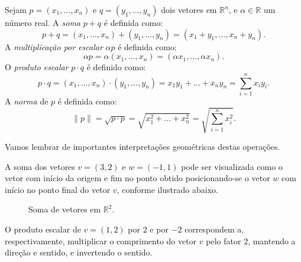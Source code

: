 \begin{definition}
    Sejam $p=(x_1, \ldots, x_n)$ e $q=(y_1, \ldots, y_n)$ dois vetores em $\mathbb R^n$, e $\alpha \in \mathbb R$ um número real.
    A \emph{soma} $p+q$ é definida como:
    \begin{equation*}
        p+q =(x_1, \ldots, x_n)+(y_1, \ldots, y_n)=(x_1+y_1, \ldots, x_n+y_n).
    \end{equation*}
    A \emph{multiplicação por escalar} $\alpha p$ é definida como:
    \begin{equation*}
        \alpha p = \alpha (x_1, \ldots, x_n) = (\alpha x_1, \ldots, \alpha x_n).
    \end{equation*}
    O \emph{produto escalar} $p \cdot q$ é definido como:
    \begin{equation*}
        p \cdot q = (x_1, \ldots, x_n) \cdot (y_1, \ldots, y_n) = x_1y_1 + \ldots + x_ny_n=\sum_{i=1}^n x_iy_i.
    \end{equation*}
    A \emph{norma} de $p$ é definida como:
    \begin{equation*}
        \|p\| = \sqrt{p\cdot p}=\sqrt{x_1^2 + \ldots + x_n^2} = \sqrt{\sum_{i=1}^n x_i^2}.
    \end{equation*}
\end{definition}

Vamos lembrar de importantes interpretações geométricas destas operações.

A soma dos vetores $v=(3, 2)$ e $w=(-1, 1)$ pode ser visualizada como o vetor com início da origem e fim no ponto obtido posicionando-se o vetor $w$ com início no ponto final do vetor $v$, conforme ilustrado abaixo.

\begin{figure}[ht]
    \centering
    \caption{Soma de vetores em $\mathbb R^2$.}
\end{figure}
O produto escalar de $v=(1, 2)$ por $2$ e por $-2$ correspondem a, respectivamente, multiplicar o comprimento do vetor $v$ pelo fator $2$, mantendo a direção e sentido, e invertendo o sentido.

